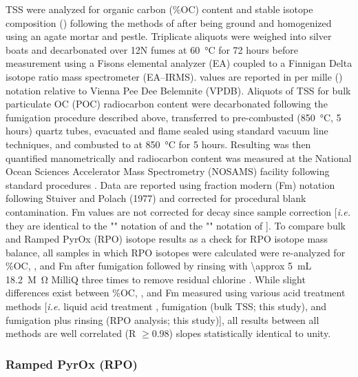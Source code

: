 TSS were analyzed for organic carbon (\%OC) content and stable isotope composition () following the methods of \citet{Whiteside:2011jea} after being ground and homogenized using an agate mortar and pestle. Triplicate aliquots were weighed into silver boats and decarbonated over 12N  fumes at \SI{60}{\celsius} for 72 hours before measurement using a Fisons elemental analyzer (EA) coupled to a Finnigan Delta isotope ratio mass spectrometer (EA--IRMS).  values are reported in per mille (\si{\permil}) notation relative to Vienna Pee Dee Belemnite (VPDB). Aliquots of TSS for bulk particulate OC (POC) radiocarbon content were decarbonated following the fumigation procedure described above, transferred to pre-combusted (\SI{850}{\celsius}, 5 hours) quartz tubes, evacuated and flame sealed using standard vacuum line techniques, and combusted to  at \SI{850}{\celsius} for 5 hours. Resulting  was then quantified manometrically and radiocarbon content was measured at the National Ocean Sciences Accelerator Mass Spectrometry (NOSAMS) facility following standard procedures \citep{McNichol:1994ty,Pearson:1998vy}. Data are reported using fraction modern (Fm) notation following Stuiver and Polach (1977) and corrected for procedural blank contamination. Fm values are not corrected for decay since sample correction [\textit{i.e.} they are identical to the "" notation of \citet{Mook:1999vf} and the "" notation of \citet{Reimer:2004th}]. To compare bulk and Ramped PyrOx (RPO) isotope results as a check for RPO isotope mass balance, all samples in which RPO isotopes were calculated were re-analyzed for \%OC, , and Fm after fumigation followed by rinsing with \SI{\approx 5}{mL} \SI{18.2}{M \ohm} MilliQ  three times to remove residual chlorine \citep{Hemingway:2016rc}. While slight differences exist between \%OC, , and Fm measured using various acid treatment methods [\textit{i.e.} liquid acid treatment \citep[bulk soils;][]{Hilton:2010cg,Hilton:2013kq}, fumigation (bulk TSS; this study), and fumigation plus rinsing (RPO analysis; this study)], all results between all methods are well correlated (R $\geq 0.98$) slopes statistically identical to unity.

\subsubsection{Ramped PyrOx (RPO)}

